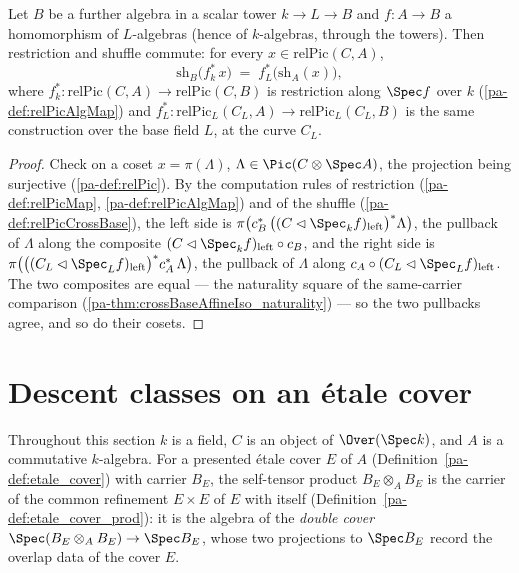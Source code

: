 \begin{theorem}
  \label{pa-thm:relPicCrossBase_relPicAlgMap}
  \leanok

  Let \(B\) be a further algebra in a scalar tower \(k \to L \to B\) and
  \(f : A \to B\) a homomorphism of \(L\)-algebras (hence of \(k\)-algebras, through
  the towers). Then restriction and shuffle commute: for every
  \(x \in \mathrm{relPic}(C,A)\),
  \[
    \mathrm{sh}_B\bigl(f^{*}_{k}\, x\bigr) \;=\; f^{*}_{L}\bigl(\mathrm{sh}_A(x)\bigr),
  \]
  where \(f^{*}_{k} : \mathrm{relPic}(C,A) \to \mathrm{relPic}(C,B)\) is restriction
  along \(\Spec f\) over \(k\) (\ref{pa-def:relPicAlgMap}) and
  \(f^{*}_{L} : \mathrm{relPic}_L(C_L,A) \to \mathrm{relPic}_L(C_L,B)\) is the same
  construction over the base field \(L\), at the curve \(C_L\).
\end{theorem}
\begin{proof}
  \leanok
  Check on a coset \(x = \pi(\Lambda)\), \(\Lambda \in \Pic(C \otimes \Spec A)\), the
  projection being surjective (\ref{pa-def:relPic}). By the computation rules of
  restriction (\ref{pa-def:relPicMap}, \ref{pa-def:relPicAlgMap}) and of the shuffle
  (\ref{pa-def:relPicCrossBase}), the left side is
  \(\pi\bigl(c_B^{*}\,\bigl((C \lhd \Spec_k f)_{\mathrm{left}}\bigr)^{*}\Lambda\bigr)\),
  the pullback of \(\Lambda\) along the composite
  \((C \lhd \Spec_k f)_{\mathrm{left}} \circ c_B\), and the right side is
  \(\pi\bigl(\bigl((C_L \lhd \Spec_L f)_{\mathrm{left}}\bigr)^{*} c_A^{*}\,
  \Lambda\bigr)\), the pullback of \(\Lambda\) along
  \(c_A \circ (C_L \lhd \Spec_L f)_{\mathrm{left}}\). The two composites are equal ---
  the naturality square of the same-carrier comparison
  (\ref{pa-thm:crossBaseAffineIso_naturality}) --- so the two pullbacks agree, and so do
  their cosets.
\end{proof}

\section{Descent classes on an \'etale cover}

Throughout this section \(k\) is a field, \(C\) is an object of \(\Over(\Spec k)\), and \(A\) is
a commutative \(k\)-algebra. For a presented \'etale cover \(E\) of \(A\)
(Definition~\ref{pa-def:etale_cover}) with carrier \(B_E\), the self-tensor product
\(B_E \otimes_A B_E\) is the carrier of the common refinement \(E \times E\) of \(E\) with
itself (Definition~\ref{pa-def:etale_cover_prod}): it is the algebra of the \emph{double cover}
\(\Spec(B_E \otimes_A B_E) \to \Spec B_E\), whose two projections to \(\Spec B_E\) record the
overlap data of the cover \(E\).


